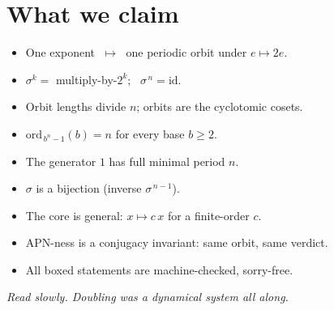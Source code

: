 \documentclass[11pt]{article}
\begin{document}
\section{What we claim}

\bigskip

\begin{itemize}
  \item One exponent $\;\mapsto\;$ one periodic orbit under $e \mapsto 2e$.\\[6pt]
  \item $\sigma^{k} = {}$ multiply-by-$2^{k}$; \ $\sigma^{\,n}=\mathrm{id}$.\\[6pt]
  \item Orbit lengths divide $n$; orbits are the cyclotomic cosets.\\[6pt]
  \item $\mathrm{ord}_{\,b^{n}-1}(b)=n$ for every base $b\ge 2$.\\[6pt]
  \item The generator $1$ has full minimal period $n$.\\[6pt]
  \item $\sigma$ is a bijection (inverse $\sigma^{\,n-1}$).\\[6pt]
  \item The core is general: $x \mapsto c\,x$ for a finite-order $c$.\\[6pt]
  \item APN-ness is a conjugacy invariant: same orbit, same verdict.\\[6pt]
  \item All boxed statements are machine-checked, sorry-free.
\end{itemize}

\vfill

\noindent\textit{Read slowly. Doubling was a dynamical system all along.}
\end{document}
